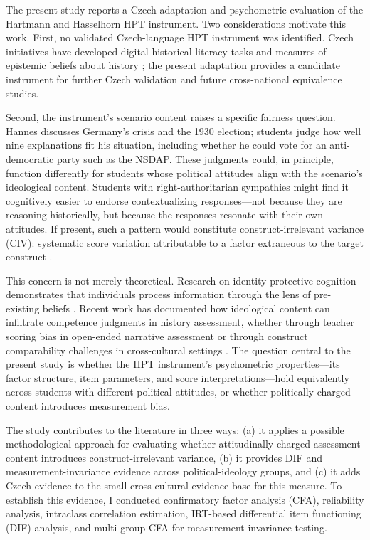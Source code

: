 \documentclass[
  12pt,
]{article}
\newcommand{\Loc}[1]{\linelabel{loc:#1}}
\newcommand{\LocEnd}[1]{\linelabel{loc:#1:end}}
\begin{document}
The present study reports a Czech adaptation and psychometric evaluation of the Hartmann and Hasselhorn HPT instrument. Two considerations motivate this work. First, no validated Czech-language HPT instrument was identified. Czech initiatives have developed digital historical-literacy tasks and measures of epistemic beliefs about history \citep{Cinatl_et_al2021Historicka,Ripka_et_al2024Epistemic}; the present adaptation provides a candidate instrument for further Czech validation and future cross-national equivalence studies.

Second, the instrument's scenario content raises a specific fairness question. \Loc{intro-hannes}Hannes discusses Germany's crisis and the 1930 election; students judge how well nine explanations fit his situation, including whether he could vote for an anti-democratic party such as the NSDAP.\LocEnd{intro-hannes} These judgments could, in principle, function differently for students whose political attitudes align with the scenario's ideological content. Students with right-authoritarian sympathies might find it cognitively easier to endorse contextualizing responses---not because they are reasoning historically, but because the responses resonate with their own attitudes. If present, such a pattern would constitute construct-irrelevant variance (CIV): systematic score variation attributable to a factor extraneous to the target construct \citep{AERA2014Standards,Messick1995Validity}.

This concern is not merely theoretical. Research on identity-protective cognition demonstrates that individuals process information through the lens of pre-existing beliefs \citep{Jost2003,Kahan2017}. Recent work has documented how ideological content can infiltrate competence judgments in history assessment, whether through teacher scoring bias in open-ended narrative
assessment \citep{Alven2019Bias} or through construct comparability challenges in cross-cultural settings \citep{Badham_et_al2025Construct}. The question central to the present study is whether the HPT instrument's psychometric properties---its factor structure, item parameters, and score interpretations---hold equivalently across students with different political attitudes, or whether politically charged content introduces measurement bias.

The study contributes to the literature in three ways: (a) it applies a possible methodological approach for evaluating whether attitudinally charged assessment content introduces construct-irrelevant variance, (b) it provides DIF and measurement-invariance evidence across political-ideology groups, and (c) it adds Czech evidence to the small cross-cultural evidence base for this measure. To establish this evidence, I conducted confirmatory factor analysis (CFA), reliability analysis, intraclass correlation estimation, IRT-based differential item functioning (DIF) analysis, and multi-group CFA for measurement invariance testing.
\end{document}
